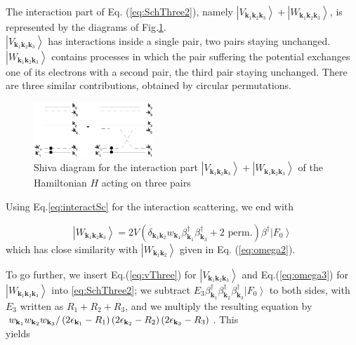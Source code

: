 \documentclass[epj]{svjour}
\begin{document}
The interaction part of Eq. (\ref{eq:SchThree2}), namely $\left|V_{\mathbf{k} _1\mathbf{k} _2%
\mathbf{k} _3}\right>+\left|W_{\mathbf{k} _1\mathbf{k} _2\mathbf{k} _3}\right> $, is represented by the diagrams of Fig.\ref{fig:threeP}. \\$\left|V_{\mathbf{k} _1\mathbf{k} _2
\mathbf{k} _3}\right>$ has interactions inside a single pair, two pairs
staying unchanged. $\left|W_{\mathbf{k} _1\mathbf{k} _2\mathbf{k} _3}\right> $ contains processes in which the pair suffering the potential exchanges one of its electrons with a second pair, the third pair staying unchanged.  There  are three similar  contributions, obtained by circular permutations.
\begin{figure}[htb]
   \includegraphics[width=0.4\textwidth]{threePair.eps}
\caption{Shiva diagram for the interaction part $\left|V_{\mathbf{k} _1\mathbf{k} _2
\mathbf{k} _3}\right> +\left|W_{\mathbf{k} _1\mathbf{k} _2
\mathbf{k} _3}\right>$ of the Hamiltonian $H$ acting on three pairs }\label{fig:threeP}
 \end{figure}

Using Eq.\eqref{eq:interactSc} for the interaction scattering, we end with

\begin{equation}\label{eq:omega3}
\left|W_{\mathbf{k} _1\mathbf{k} _2\mathbf{k} _3}\right>= 2V(\delta_{\mathbf{k} _1\mathbf{k} _2}w_{\mathbf{k} _1}\beta^{\dagger}_{\mathbf{k} _1}\beta^{\dagger}_{\mathbf{k} _3}+ \text{2 perm.})\beta^{\dagger}\left|F_0\right>
\end{equation}
which has close similarity with  $\left|W_{\mathbf{k} _1\mathbf{k} _2}\right> $ given in Eq. (\ref{eq:omega2}). 



To go further, we insert Eq.(\ref{eq:vThree}) for $\left|V_{\mathbf{k} _1\mathbf{k} _2\mathbf{k} _3}\right>$  and Eq.(\ref{eq:omega3}) for $\left|W_{\mathbf{k} _1\mathbf{k} _2\mathbf{k} _3}\right> $ into \eqref{eq:SchThree2}; we subtract $E
_3\beta^{\dagger}_{\mathbf{k} _1}\beta^{\dagger}_{\mathbf{k}
_2}\beta^{\dagger}_{\mathbf{k} _3}\left|F_0\right>  $ to both sides, with $%
E _3$ written as $R_1+R_2+R_3$, and we multiply the resulting equation
by \\$w_{\mathbf{k} _1}w_{\mathbf{k} _2}w_{\mathbf{k} _3}/\left(2\epsilon_{%
\mathbf{k} _1}-R_1\right) \left(2\epsilon_{\mathbf{k} _2}-R_2\right)
\left(2\epsilon_{\mathbf{k} _3}-R_3\right) $. This \\yields
\end{document}
